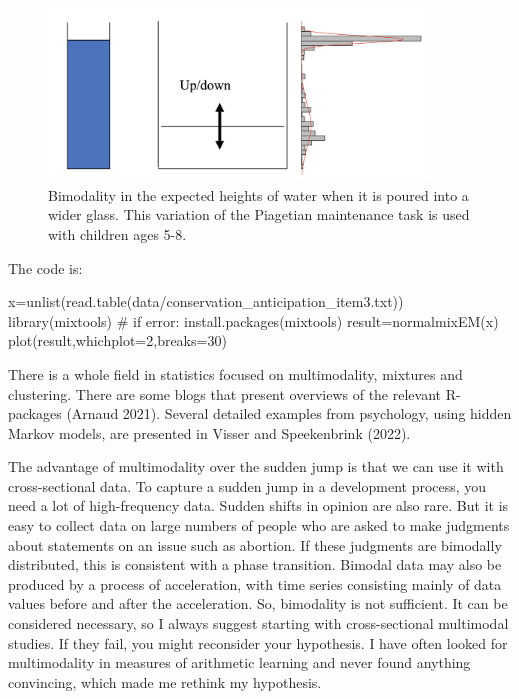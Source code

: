 \documentclass[
  letterpaper,
]{scrbook}
\newenvironment{Shaded}{\begin{snugshade}}{\end{snugshade}}
\newcommand{\AttributeTok}[1]{\textcolor[rgb]{0.40,0.45,0.13}{#1}}
\newcommand{\CommentTok}[1]{\textcolor[rgb]{0.37,0.37,0.37}{#1}}
\newcommand{\DecValTok}[1]{\textcolor[rgb]{0.68,0.00,0.00}{#1}}
\newcommand{\FunctionTok}[1]{\textcolor[rgb]{0.28,0.35,0.67}{#1}}
\newcommand{\NormalTok}[1]{\textcolor[rgb]{0.00,0.23,0.31}{#1}}
\newcommand{\OtherTok}[1]{\textcolor[rgb]{0.00,0.23,0.31}{#1}}
\newcommand{\StringTok}[1]{\textcolor[rgb]{0.13,0.47,0.30}{#1}}
\begin{document}
\begin{figure}

{\centering \includegraphics[width=3.98933in,height=\textheight]{media/ch3/image20.jpg}

}

\caption{\label{fig-ch3-img20-old-32}Bimodality in the expected heights
of water when it is poured into a wider glass. This variation of the
Piagetian maintenance task is used with children ages 5-8.}

\end{figure}

The code is:

\begin{Shaded}
\begin{Highlighting}[]
\NormalTok{x}\OtherTok{=}\FunctionTok{unlist}\NormalTok{(}\FunctionTok{read.table}\NormalTok{(}\StringTok{\textquotesingle{}data/conservation\_anticipation\_item3.txt\textquotesingle{}}\NormalTok{))}
\FunctionTok{library}\NormalTok{(mixtools) }\CommentTok{\# if error: install.packages(\textquotesingle{}mixtools\textquotesingle{})}
\NormalTok{result}\OtherTok{=}\FunctionTok{normalmixEM}\NormalTok{(x)}
\FunctionTok{plot}\NormalTok{(result,}\AttributeTok{whichplot=}\DecValTok{2}\NormalTok{,}\AttributeTok{breaks=}\DecValTok{30}\NormalTok{)}
\end{Highlighting}
\end{Shaded}

There is a whole field in statistics focused on multimodality, mixtures
and clustering. There are some blogs that present overviews of the
relevant R-packages (Arnaud 2021). Several detailed examples from
psychology, using hidden Markov models, are presented in Visser and
Speekenbrink (2022).

The advantage of multimodality over the sudden jump is that we can use
it with cross-sectional data. To capture a sudden jump in a development
process, you need a lot of high-frequency data. Sudden shifts in opinion
are also rare. But it is easy to collect data on large numbers of people
who are asked to make judgments about statements on an issue such as
abortion. If these judgments are bimodally distributed, this is
consistent with a phase transition. Bimodal data may also be produced by
a process of acceleration, with time series consisting mainly of data
values before and after the acceleration. So, bimodality is not
sufficient. It can be considered necessary, so I always suggest starting
with cross-sectional multimodal studies. If they fail, you might
reconsider your hypothesis. I have often looked for multimodality in
measures of arithmetic learning and never found anything convincing,
which made me rethink my hypothesis.
\end{document}
